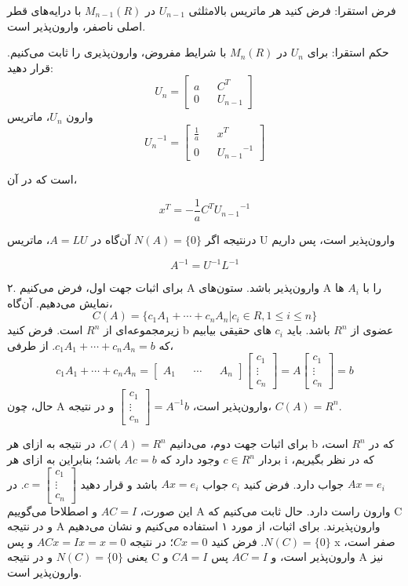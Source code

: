 فرض استقرا: فرض کنید هر ماتریس بالامثلثی $U_{n-1}$ در $M_{n-1}(R)$ با درایه‌های قطر اصلی ناصفر، وارون‌پذیر است.

حکم استقرا: برای  $U_{n}$ در $M_{n}(R)$ با شرایط مفروض، وارون‌پذیری را ثابت می‌کنیم. قرار دهید:
$$U_n = \begin{bmatrix}
a && C^T\\
0 && U_{n-1}
\end{bmatrix}$$
وارون $U_n$، ماتریس 
$${U_n}^{-1} = \begin{bmatrix}
\frac{1}{a} && x^T\\
0 && {U_{n-1}}^{-1}
\end{bmatrix}$$

است که در آن،

$$x^T = - \frac{1}{a} C^T {U_{n-1}}^{-1}$$

درنتیجه اگر $N(A) = \{ 0 \}$ آن‌گاه در $A = LU$، ماتریس U وارون‌پذیر است، پس داریم

$$A^{-1} = U^{-1} L^{-1}$$


۲. برای اثبات جهت اول، فرض می‌کنیم A وارون‌پذیر باشد. ستون‌های A را با $A_i$ ها نمایش می‌دهیم. آن‌گاه،
$$C(A) = \{ c_1 A_1 + \cdots + c_n A_n | c_i \in R, 1 \leq i \leq n \}$$
زیرمجموعه‌ای از $R^n$ است. فرض کنید b عضوی از $R^n$ باشد. باید $c_i$ های حقیقی بیابیم که $c_1 A_1 + \cdots + c_n A_n = b$. از طرفی،
$$c_1 A_1 + \cdots + c_n A_n = \begin{bmatrix}
A_1 && \cdots && A_n
\end{bmatrix} \begin{bmatrix}
c_1 \\
\vdots \\
c_n
\end{bmatrix} = A \begin{bmatrix}
c_1 \\
\vdots \\
c_n
\end{bmatrix} = b$$
حال، چون A وارون‌پذیر است،
$\begin{bmatrix}
c_1 \\
\vdots \\
c_n
\end{bmatrix} = A^{-1} b$ و در نتیجه،
$C(A) = R^n$.

برای اثبات جهت دوم، می‌دانیم $C(A) = R^n$، در نتیجه به ازای هر b که در $R^n$ است، بردار $c \in R^n$ وجود دارد که $Ac=b$ باشد؛ بنابراین به ازای هر i که در نظر بگیریم، $Ax=e_i$ جواب دارد. فرض کنید $c_i$ جواب $Ax=e_i$ باشد و قرار دهید $c = \begin{bmatrix}
c_1 \\
\vdots \\
c_n
\end{bmatrix}$.
در این صورت، $AC=I$ و اصطلاحا می‌گوییم A وارون راست دارد. حال ثابت می‌کنیم که C و در نتیجه A وارون‌پذیرند. برای اثبات، از مورد ۱ استفاده می‌کنیم و نشان می‌دهیم $N(C) = \{ 0 \}$. فرض کنید $Cx=0$؛ در نتیجه $ACx = Ix = x = 0$ و پس x صفر است، یعنی $N(C) = \{ 0 \}$ و در نتیجه C وارون‌پذیر است، و $AC=I$ پس $CA=I$ و A نیز وارون‌پذیر است.



